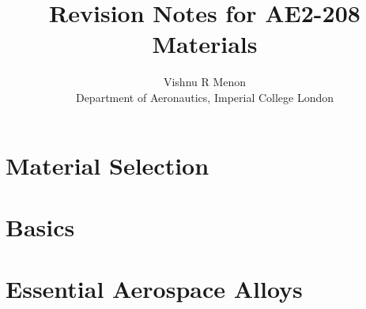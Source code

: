 \documentclass{summary_notes}
\begin{document}
\title{\bf Revision Notes for AE2-208 Materials}
\author{Vishnu R Menon\\ 
\small{Department of Aeronautics, Imperial College London}}
\maketitle
\begin{multicols*}{2}
\tableofcontents
\end{multicols*}
\newpage

\setcounter{chapter}{-1}
\chapter{Material Selection}
\begin{multicols*}{2}


\end{multicols*}


\chapter{Basics}
\begin{multicols*}{2}






\end{multicols*}


\chapter{Essential Aerospace Alloys}
\begin{multicols*}{2}





\end{multicols*}
\end{document}
